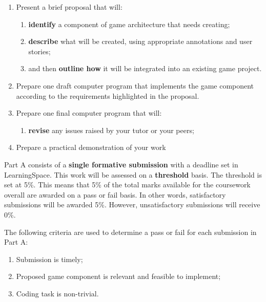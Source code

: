 \documentclass{../fal_assignment}
\begin{document}
\begin{enumerate}[label=(\alph*)]
    \item Present a brief proposal that will:
    	\begin{enumerate}[label=\roman*.]
    		\item \textbf{identify} a component of game architecture that needs creating;
    		\item \textbf{describe} what will be created, using appropriate annotations and user stories;
    		\item and then \textbf{outline how} it will be integrated into an existing game project.
	\end{enumerate}
    \item Prepare one draft computer program that implements the game component according to the requirements highlighted in the proposal.
    \item Prepare one final computer program that will:
    	\begin{enumerate}[label=\roman*.]
    		\item \textbf{revise} any issues raised by your tutor or your peers;
	\end{enumerate}
    \item Prepare a practical demonstration of your work
\end{enumerate}


Part A consists of a \textbf{single formative submission} with a deadline set in LearningSpace. This work will be assessed on a \textbf{threshold} basis. The threshold is set at 5\%. This means that 5\% of the total marks available for the coursework overall are awarded on a pass or fail basis. In other words, satisfactory submissions will be awarded 5\%. However, unsatisfactory submissions will receive 0\%.

The following criteria are used to determine a pass or fail for each submission in Part A:

\begin{enumerate}[label=(\alph*)]
	\item Submission is timely;
	\item Proposed game component is relevant and feasible to implement;
	\item Coding task is non-trivial.
\end{enumerate}
\end{document}
